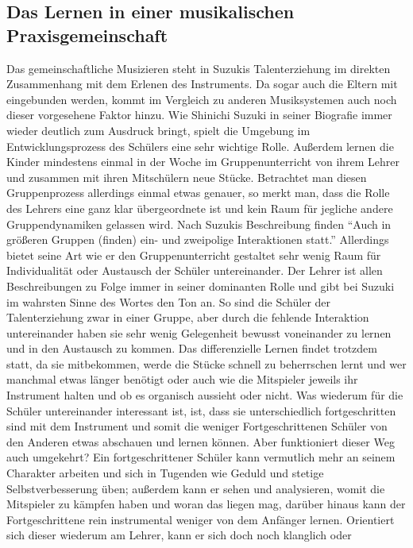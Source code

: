 \subsection{Das Lernen in einer musikalischen Praxisgemeinschaft}
Das gemeinschaftliche Musizieren steht in Suzukis Talenterziehung im direkten
Zusammenhang mit dem Erlenen des Instruments. Da sogar auch die Eltern mit
eingebunden werden, kommt im Vergleich zu anderen Musiksystemen auch noch dieser
vorgesehene Faktor hinzu. Wie Shinichi Suzuki in seiner Biografie immer wieder
deutlich zum Ausdruck bringt, spielt die Umgebung im Entwicklungsprozess des
Schülers eine sehr wichtige Rolle. Außerdem lernen die Kinder mindestens einmal
in der Woche im Gruppenunterricht von ihrem Lehrer und zusammen mit ihren
Mitschülern neue Stücke. Betrachtet man diesen Gruppenprozess allerdings einmal
etwas genauer, so merkt man, dass die Rolle des Lehrers eine ganz klar
übergeordnete ist und kein Raum für jegliche andere Gruppendynamiken gelassen
wird. Nach Suzukis Beschreibung finden \enquote{Auch in größeren Gruppen (finden) ein-
und zweipolige Interaktionen statt.} \autocite[30]{suzuki:erziehung_ist_liebe}
Allerdings bietet seine Art wie er den Gruppenunterricht gestaltet sehr wenig
Raum für Individualität oder Austausch der Schüler untereinander. Der Lehrer ist
allen Beschreibungen zu Folge immer in seiner dominanten Rolle und gibt bei
Suzuki im wahrsten Sinne des Wortes den Ton an. So sind die Schüler der
Talenterziehung zwar in einer Gruppe, aber durch die fehlende Interaktion
untereinander haben sie sehr wenig Gelegenheit bewusst voneinander zu lernen und
in den Austausch zu kommen. Das differenzielle Lernen findet trotzdem statt, da
sie mitbekommen, werde die Stücke schnell zu beherrschen lernt und wer manchmal
etwas länger benötigt oder auch wie die Mitspieler jeweils ihr Instrument halten
und ob es organisch aussieht oder nicht. Was wiederum für die Schüler
untereinander interessant ist, ist, dass sie unterschiedlich fortgeschritten
sind mit dem Instrument und somit die weniger Fortgeschrittenen Schüler von den
Anderen etwas abschauen und lernen können. Aber funktioniert dieser Weg auch
umgekehrt? Ein fortgeschrittener Schüler kann vermutlich mehr an seinem
Charakter arbeiten und sich in Tugenden wie Geduld und stetige
Selbstverbesserung üben; außerdem kann er sehen und analysieren, womit die
Mitspieler zu kämpfen haben und woran das liegen mag, darüber hinaus kann
der Fortgeschrittene rein instrumental weniger von dem Anfänger lernen.
Orientiert sich dieser wiederum am Lehrer, kann er sich doch noch klanglich oder
